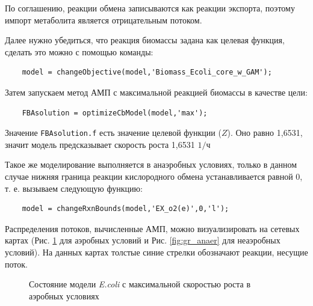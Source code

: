 \documentclass[a4paper, 12pt]{article}
\begin{document}
По соглашению, реакции обмена записываются как реакции экспорта, поэтому импорт метаболита является отрицательным потоком.

Далее нужно убедиться, что реакция биомассы задана как целевая функция, сделать это можно с помощью команды:
\begin{lstlisting}
    model = changeObjective(model,'Biomass_Ecoli_core_w_GAM');
\end{lstlisting}

Затем запускаем метод АМП с максимальной реакцией биомассы в качестве цели:
\begin{lstlisting}
    FBAsolution = optimizeCbModel(model,'max');
\end{lstlisting}

Значение \texttt{FBAsolution.f} есть значение целевой функции ($Z$). Оно равно 1,6531, значит модель предсказывает скорость роста 1,6531 $1/\textrm{ч}$

Такое же моделирование выполняется в анаэробных условиях, только в данном случае нижняя граница реакции кислородного обмена устанавливается равной 0, т. е. вызываем следующую функцию:
\begin{lstlisting}
    model = changeRxnBounds(model,'EX_o2(e)',0,'l');
\end{lstlisting}

Распределения потоков, вычисленные АМП, можно визуализировать на сетевых картах (Рис. \ref{fig:gr_aer} для аэробных условий и Рис. \ref{fig:gr_anaer} для неаэробных условий). На данных картах толстые синие стрелки обозначают реакции, несущие поток.

\begin{figure}[H]
    \caption{Состояние модели \textit{E.coli} с максимальной скоростью роста в аэробных условиях}
    \label{fig:gr_aer}
\end{figure}
\end{document}
